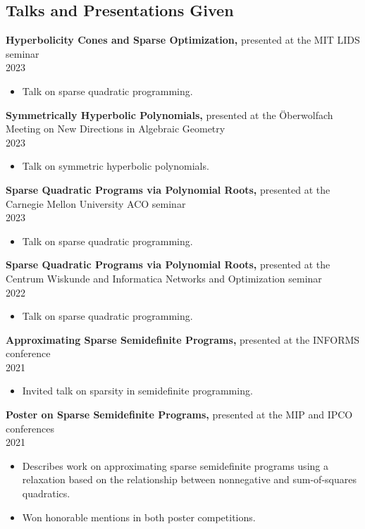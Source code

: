 \documentclass[margin]{res}
\begin{document}
\begin{resume}
\section{Talks and Presentations Given}

{\bf  Hyperbolicity Cones and Sparse Optimization,} presented at the MIT LIDS seminar \\ 2023 
\begin{itemize} \itemsep -2pt %
\item Talk on sparse quadratic programming.
\end{itemize}

{\bf  Symmetrically Hyperbolic Polynomials,} presented at the \"Oberwolfach Meeting on New Directions in Algebraic Geometry \\ 2023 
\begin{itemize} \itemsep -2pt %
\item Talk on symmetric hyperbolic polynomials.
\end{itemize}

{\bf  Sparse Quadratic Programs via Polynomial Roots,} presented at the Carnegie Mellon University ACO seminar \\ 2023 
\begin{itemize} \itemsep -2pt %
\item Talk on sparse quadratic programming.
\end{itemize}

{\bf  Sparse Quadratic Programs via Polynomial Roots,} presented at the Centrum Wiskunde and Informatica Networks and Optimization seminar \\ 2022 
\begin{itemize} \itemsep -2pt %
\item Talk on sparse quadratic programming.
\end{itemize}

{\bf  Approximating Sparse Semidefinite Programs,} presented at the INFORMS conference \\ 2021 
\begin{itemize} \itemsep -2pt %
\item Invited talk on sparsity in semidefinite programming.
\end{itemize}


{\bf  Poster on Sparse Semidefinite Programs,} presented at the MIP and IPCO conferences \\ 2021 
\begin{itemize} \itemsep -2pt %
\item Describes work on approximating sparse semidefinite programs using a relaxation based on the relationship between nonnegative and sum-of-squares quadratics.
\item Won honorable mentions in both poster competitions.
\end{itemize}


\end{resume}
\end{document}
